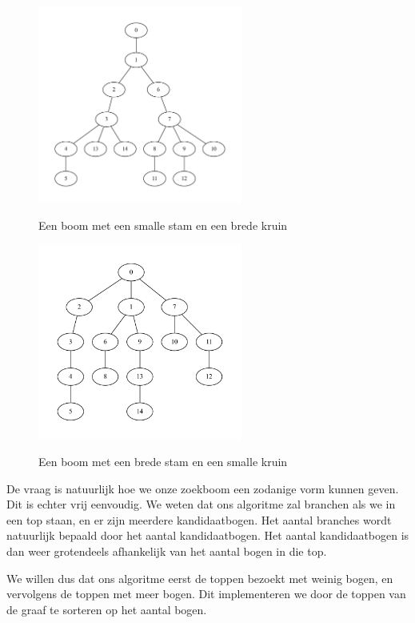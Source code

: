 \documentclass{article}
\begin{document}
\begin{figure}
\begin{center}
\includegraphics[width=0.6\textwidth]{images/good-tree.pdf}
\caption{Een boom met een smalle stam en een brede kruin}
\label{fig:good-tree}
\includegraphics[width=0.6\textwidth]{images/bad-tree.pdf}
\caption{Een boom met een brede stam en een smalle kruin}
\label{fig:bad-tree}
\end{center}
\end{figure}

De vraag is natuurlijk hoe we onze zoekboom een zodanige vorm kunnen geven. Dit
is echter vrij eenvoudig. We weten dat ons algoritme zal branchen als we in een
top staan, en er zijn meerdere kandidaatbogen. Het aantal branches wordt
natuurlijk bepaald door het aantal kandidaatbogen. Het aantal kandidaatbogen is
dan weer grotendeels afhankelijk van het aantal bogen in die top.
\newline

We willen dus dat ons algoritme eerst de toppen bezoekt met weinig bogen, en
vervolgens de toppen met meer bogen. Dit implementeren we door de toppen van
de graaf te sorteren op het aantal bogen.
\newline
\end{document}

